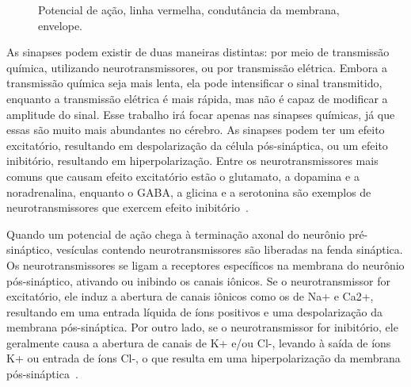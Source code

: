 \begin{figure}[!ht]
\caption{Potencial de ação, linha vermelha, condutância da membrana, envelope.}
\end{figure}

As sinapses podem existir de duas maneiras distintas: por meio de transmissão química, utilizando neurotransmissores, ou por
transmissão elétrica. Embora a transmissão química seja mais lenta, ela pode intensificar o sinal transmitido, enquanto a
transmissão elétrica é mais rápida, mas não é capaz de modificar a amplitude do sinal. Esse trabalho irá focar apenas nas sinapses
químicas, já que essas são muito mais abundantes no cérebro. As sinapses podem ter um efeito excitatório, resultando em
despolarização da célula pós-sináptica, ou um efeito inibitório, resultando em hiperpolarização. Entre os neurotransmissores mais
comuns que causam efeito excitatório estão o glutamato, a dopamina e a noradrenalina, enquanto o GABA, a glicina e a serotonina
são exemplos de neurotransmissores que exercem efeito inibitório~\cite{kandelPrinciples2021}.

Quando um potencial de ação chega à terminação axonal do neurônio pré-sináptico, vesículas contendo neurotransmissores são
liberadas na fenda sináptica. Os neurotransmissores se ligam a receptores específicos na membrana do neurônio pós-sináptico,
ativando ou inibindo os canais iônicos. Se o neurotransmissor for excitatório, ele induz a abertura de canais iônicos como os de
Na+ e Ca2+, resultando em uma entrada líquida de íons positivos e uma despolarização da membrana pós-sináptica. Por outro lado, se
o neurotransmissor for inibitório, ele geralmente causa a abertura de canais de K+ e/ou Cl-, levando à saída de íons K+ ou entrada
de íons Cl-, o que resulta em uma hiperpolarização da membrana pós-sináptica~\cite{kandelPrinciples2021}.